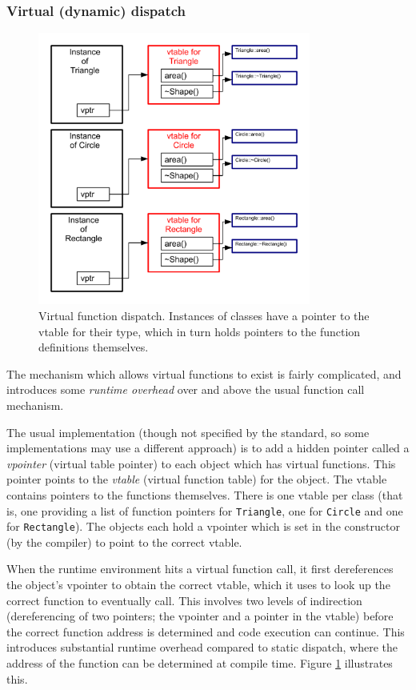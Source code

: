 \documentclass[a4paper]{scrartcl}
\begin{document}
\subsubsection{Virtual (dynamic) dispatch}\label{sec:vdispatch}
\begin{figure}[t]
\center
\includegraphics[width=0.8\textwidth]{vdispatch}
\caption[Virtual function dispatch]{\label{virtual_dispatch}Virtual function dispatch. Instances of classes have a pointer to the vtable for their type, which in turn holds pointers to the function definitions themselves.}
\end{figure}

The mechanism which allows virtual functions to exist is fairly complicated, and introduces some \emph{runtime overhead} over and above the usual function call mechanism.

The usual implementation (though not specified by the standard, so some implementations may use a different approach) is to add a hidden pointer called a \emph{vpointer} (virtual table pointer) to each object which has virtual functions. This pointer points to the \emph{vtable} (virtual function table) for the object. The vtable contains pointers to the functions themselves. There is one vtable per class (that is, one providing a list of function pointers for \verb|Triangle|, one for \verb|Circle| and one for \verb|Rectangle|). The objects each hold a vpointer which is set in the constructor (by the compiler) to point to the correct vtable.

When the runtime environment hits a virtual function call, it first dereferences the object's vpointer to obtain the correct vtable, which it uses to look up the correct function to eventually call. This involves two levels of indirection (dereferencing of two pointers; the vpointer and a pointer in the vtable) before the correct function address is determined and code execution can continue. This introduces substantial runtime overhead compared to static dispatch, where the address of the function can be determined at compile time. Figure \ref{virtual_dispatch} illustrates this.
\end{document}
